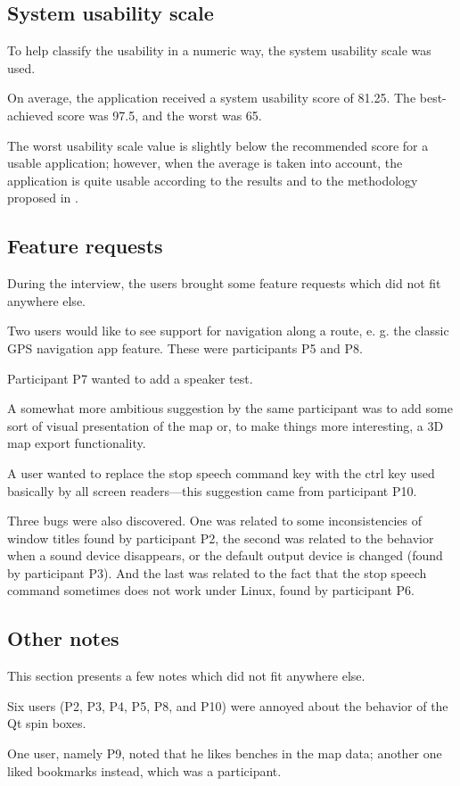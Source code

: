 \documentclass[nolof,digital]{fithesis3}
\begin{document}
\subsection{System usability scale}
To help classify the usability in a numeric way, the system usability scale was used.

On average, the application received a system usability score of 81.25. The best-achieved score was 97.5, and the worst was 65.

The worst usability scale value is slightly below the recommended score for a usable application; however, when the average is taken into account, the application is quite usable according to the results and to the methodology proposed in \parencite{SauroJeff2012Qtue}.
\subsection{Feature requests}
During the interview, the users brought some feature requests which did not fit anywhere else.

Two users would like to see support for navigation along a route, e. g. the classic GPS navigation app feature. These were participants P5 and P8.

Participant P7 wanted to add a speaker test.

A somewhat more ambitious suggestion by the same participant was to add some sort of visual presentation of the map or, to make things more interesting, a 3D map export functionality.

A user wanted to replace the stop speech command key with the ctrl key used basically by all screen readers—this suggestion came from participant P10.

Three bugs were also discovered. One was related to some inconsistencies of window titles found by participant P2, the second was related to the behavior when a sound device disappears, or the default output device is changed (found by participant P3). And the last was related to the fact that the stop speech command sometimes does not work under Linux, found by participant P6.
\subsection{Other notes}
This section presents a few notes which did not fit anywhere else.

Six users (P2, P3, P4, P5, P8, and P10) were annoyed about the behavior of the Qt spin boxes.

One user, namely P9, noted that he likes benches in the map data; another one liked bookmarks instead, which was a participant.
\end{document}
